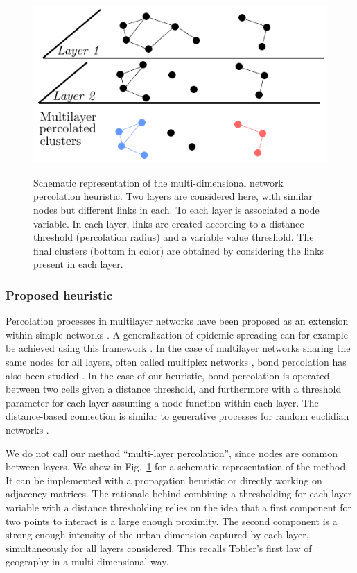 \documentclass{jimis-en}
\begin{document}
\begin{figure}[ht] 
  {\includegraphics[width=\linewidth]{figures/principle.pdf}}
  \centering
  \caption{Schematic representation of the multi-dimensional network percolation heuristic. Two layers are considered here, with similar nodes but different links in each. To each layer is associated a node variable. In each layer, links are created according to a distance threshold (percolation radius) and a variable value threshold. The final clusters (bottom in color) are obtained by considering the links present in each layer.\label{fig:method}}
\end{figure}


\subsubsection{Proposed heuristic}

Percolation processes in multilayer networks have been proposed as an extension within simple networks \citep{boccaletti2014structure}. A generalization of epidemic spreading can for example be achieved using this framework \citep{son2012percolation}. In the case of multilayer networks sharing the same nodes for all layers, often called multiplex networks \citep{aleta2018multilayer}, bond percolation has also been studied \citep{hackett2016bond}. In the case of our heuristic, bond percolation is operated between two cells given a distance threshold, and furthermore with a threshold parameter for each layer assuming a node function within each layer. The distance-based connection is similar to generative processes for random euclidian networks \citep{penrose1999k}.

We do not call our method ``multi-layer percolation'', since nodes are common between layers. We show in Fig.~\ref{fig:method} for a schematic representation of the method. It can be implemented with a propagation heuristic or directly working on adjacency matrices. The rationale behind combining a thresholding for each layer variable with a distance thresholding relies on the idea that a first component for two points to interact is a large enough proximity. The second component is a strong enough intensity of the urban dimension captured by each layer, simultaneously for all layers considered. This recalls Tobler's first law of geography \citep{tobler2004first} in a multi-dimensional way.
\end{document}
